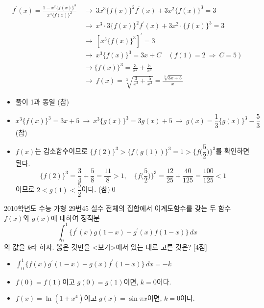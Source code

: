 \documentclass{article}
\begin{document}
\begin{sol}[풀이 2]
	\[
		\begin{aligned}
			f^{\prime}(x)=\frac{1-x^2\{f(x)\}^3}{x^3\{f(x)\}^2}~&\longrightarrow~3x^3\{f(x)\}^2f^{\prime}(x)+3x^2\{f(x)\}^3=3\\[3pt]
			&\longrightarrow~x^3\cdot3\{f(x)\}^2f^{\prime}(x)+3x^2\cdot\{f(x)\}^3=3\\[3pt]
			&\longrightarrow~[x^3\{f(x)\}^3]^{\prime}=3\\[3pt]
			&\longrightarrow~x^3\{f(x)\}^3=3x+C\quad(f(1)=2~\Longrightarrow~C=5)\\[3pt]
			&\longrightarrow\{f(x)\}^3=\frac{3}{x^2}+\frac{5}{x^3}\\[3pt]
			&\longrightarrow~f(x)=\sqrt[3]{\frac{3}{x^2}+\frac{5}{x^3}}=\frac{\sqrt[3]{3x+5}}{x}
		\end{aligned}
	\]
	\begin{itemize}
		\item[ㄱ.] 풀이 1과 동일 (참)
		\item[ㄴ.] $x^3\{f(x)\}^3=3x+5~\longrightarrow~x^3\{g(x)\}^3=3g(x)+5~\longrightarrow~g(x)=\dfrac{1}{3}\{g(x)\}^3-\dfrac{5}{3}$\quad(참)
		\item[ㄷ.] $f(x)$는 감소함수이므로 $\{f(2)\}^3>\{f(g(1))\}^3=1>\biggl\{f\biggl(\dfrac{5}{2}\biggr)\biggr\}^3$를 확인하면 된다.
			\[
				\{f(2)\}^3=\frac{3}{4}+\frac{5}{8}=\frac{11}{8}>1,\quad\biggl\{f\biggl(\frac{5}{2}\biggr)\biggr\}^3=\frac{12}{25}+\frac{40}{125}=\frac{100}{125}<1
			\]
			이므로 $2<g(1)<\dfrac{5}{2}$이다. (참)\qed
	\end{itemize}
\end{sol}

\newpage
\begin{prob}{2010학년도 수능 가형 29번}{45}
	실수 전체의 집합에서 이계도함수를 갖는 두 함수 $f(x)$와 $g(x)$에 대하여 정적분
	\[
		\int_0^1\{f^{\prime}(x)g(1-x)-g^{\prime}(x)f(1-x)\}\,dx
	\]
	의 값을 $k$라 하자. 옳은 것만을 <보기>에서 있는 대로 고른 것은? [4점]
	\begin{hint}[보기]
		\begin{itemize}
			\item[ㄱ.] $\displaystyle\int_0^1\{f(x)g^{\prime}(1-x)-g(x)f^{\prime}(1-x)\}\,dx=-k$
			\item[ㄴ.] $f(0)=f(1)$이고 $g(0)=g(1)$이면, $k=0$이다.
			\item[ㄷ.] $f(x)=\ln(1+x^4)$이고 $g(x)=\sin\pi x$이면, $k=0$이다.
		\end{itemize}
	\end{hint}
\end{prob}
\end{document}
